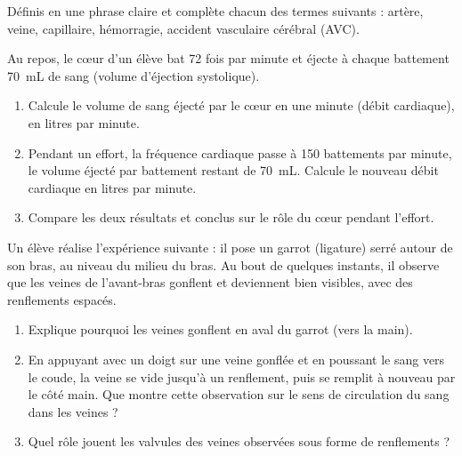 \documentclass[11pt]{article}
\newcommand{\cle}[1]{{\popxbold\color{popdark}#1}}
\newcounter{popsec}
\newcounter{popsub}
\newcommand{\courssub}[1]{%
  \stepcounter{popsub}%
  \par\vspace{9pt}\noindent{\popxbold\fontsize{11.5}{13}\selectfont\color{popink}{\color{poporange}\thepopsec.\thepopsub}\hspace{6pt}#1}\par\nopagebreak\vspace{4pt}
}
\begin{document}
\begin{exercice}[Définitions]
Définis en une phrase claire et complète chacun des termes suivants : \cle{artère}, \cle{veine}, \cle{capillaire}, \cle{hémorragie}, \cle{accident vasculaire cérébral (AVC)}.
\end{exercice}

\begin{exercice}
Au repos, le c\oe ur d'un élève bat 72 fois par minute et éjecte à chaque battement \SI{70}{mL} de sang (volume d'éjection systolique).
\begin{enumerate}
\item Calcule le volume de sang éjecté par le c\oe ur en une minute (débit cardiaque), en litres par minute.
\item Pendant un effort, la fréquence cardiaque passe à 150 battements par minute, le volume éjecté par battement restant de \SI{70}{mL}. Calcule le nouveau débit cardiaque en litres par minute.
\item Compare les deux résultats et conclus sur le rôle du c\oe ur pendant l'effort.
\end{enumerate}
\end{exercice}

\courssub{Je m'entraîne}

\begin{exercice}
Un élève réalise l'expérience suivante : il pose un garrot (ligature) serré autour de son bras, au niveau du milieu du bras. Au bout de quelques instants, il observe que les veines de l'avant-bras gonflent et deviennent bien visibles, avec des renflements espacés.
\begin{enumerate}
\item Explique pourquoi les veines gonflent en aval du garrot (vers la main).
\item En appuyant avec un doigt sur une veine gonflée et en poussant le sang vers le coude, la veine se vide jusqu'à un renflement, puis se remplit à nouveau par le côté main. Que montre cette observation sur le sens de circulation du sang dans les veines ?
\item Quel rôle jouent les valvules des veines observées sous forme de renflements ?
\end{enumerate}
\end{exercice}
\end{document}
